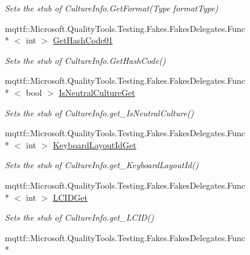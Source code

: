 \begin{DoxyCompactItemize}
\begin{DoxyCompactList}\small\item\em Sets the stub of Culture\-Info.\-Get\-Format(\-Type format\-Type)\end{DoxyCompactList}\item 
mqttf\-::\-Microsoft.\-Quality\-Tools.\-Testing.\-Fakes.\-Fakes\-Delegates.\-Func\\*
$<$ int $>$ \hyperlink{class_system_1_1_globalization_1_1_fakes_1_1_stub_culture_info_ab8df98733098dbe6bfbdfb78d9580ad5}{Get\-Hash\-Code01}
\begin{DoxyCompactList}\small\item\em Sets the stub of Culture\-Info.\-Get\-Hash\-Code()\end{DoxyCompactList}\item 
mqttf\-::\-Microsoft.\-Quality\-Tools.\-Testing.\-Fakes.\-Fakes\-Delegates.\-Func\\*
$<$ bool $>$ \hyperlink{class_system_1_1_globalization_1_1_fakes_1_1_stub_culture_info_a1f0d9d312816268882dfb77135424bc5}{Is\-Neutral\-Culture\-Get}
\begin{DoxyCompactList}\small\item\em Sets the stub of Culture\-Info.\-get\-\_\-\-Is\-Neutral\-Culture()\end{DoxyCompactList}\item 
mqttf\-::\-Microsoft.\-Quality\-Tools.\-Testing.\-Fakes.\-Fakes\-Delegates.\-Func\\*
$<$ int $>$ \hyperlink{class_system_1_1_globalization_1_1_fakes_1_1_stub_culture_info_a1c3349ad2684f69f0f032cf506fad1aa}{Keyboard\-Layout\-Id\-Get}
\begin{DoxyCompactList}\small\item\em Sets the stub of Culture\-Info.\-get\-\_\-\-Keyboard\-Layout\-Id()\end{DoxyCompactList}\item 
mqttf\-::\-Microsoft.\-Quality\-Tools.\-Testing.\-Fakes.\-Fakes\-Delegates.\-Func\\*
$<$ int $>$ \hyperlink{class_system_1_1_globalization_1_1_fakes_1_1_stub_culture_info_a9262bc8cb14fb18f324fe9f1720be197}{L\-C\-I\-D\-Get}
\begin{DoxyCompactList}\small\item\em Sets the stub of Culture\-Info.\-get\-\_\-\-L\-C\-I\-D()\end{DoxyCompactList}\item 
mqttf\-::\-Microsoft.\-Quality\-Tools.\-Testing.\-Fakes.\-Fakes\-Delegates.\-Func\\*

\end{DoxyCompactItemize}
